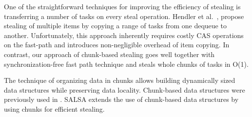 One of the straightforward techniques for improving the efficiency of stealing is transferring a
number of tasks on every steal operation. Hendler et al.~\cite{Hendler:2002:NSW:571825.571876},
propose stealing of multiple items by copying a range of tasks from one dequeue to another.
Unfortunately, this approach inherently requires costly CAS operations on the fast-path and
introduces non-negligible overhead of item copying. In contrast, our approach of chunk-based
stealing goes well together with synchronization-free fast path technique and steals whole chunks of
tasks in O(1). 

The technique of organizing data in chunks allows building dynamically sized data structures while
preserving data locality.
Chunk-based data structures were previously used in
\cite{Braginsky:2011:LLL:1946143.1946153, Gidenstam:2010:CLQ:1940234.1940266,
Hendler:2006:DNW:1160290.1160294, Sundell:2011:LAC:1989493.1989550}. 
SALSA extends the use of chunk-based data structures by using chunks for
efficient stealing.


